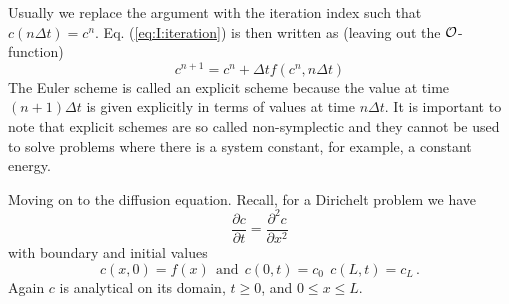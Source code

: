 Usually we replace the argument with the iteration index such that
$c(n \Delta t) = c^n$. Eq. (\ref{eq:I:iteration}) is then
written as (leaving out the $\mathcal{O}$-function)
\begin{equation}
  c^{n+1} = c^n + \Delta t f(c^n, n\Delta t)
\end{equation}
The Euler scheme is called an explicit scheme because the
value at time $(n+1)\Delta t$ is given explicitly in terms of values
at time $n\Delta t$. It is important to note that explicit schemes are
so called non-symplectic and they cannot be used to solve problems
where there is a system constant, for example, a constant energy.

\bigskip

\noindent Moving on to the diffusion equation. Recall, for a Dirichelt problem we have 
\begin{equation}
  \frac{\partial c}{\partial t} = \frac{\partial^2 c}{\partial
    x^2}
\end{equation}
with boundary and initial values
\begin{equation}
	c(x,0) = f(x) \ \ \mbox{and} \ \ c(0,t) = c_0 \ \ c(L,
  t) = c_L \, .
\end{equation}
Again $c$ is analytical on its domain, $t \geq 0$, and $0\leq x \leq L$. 

